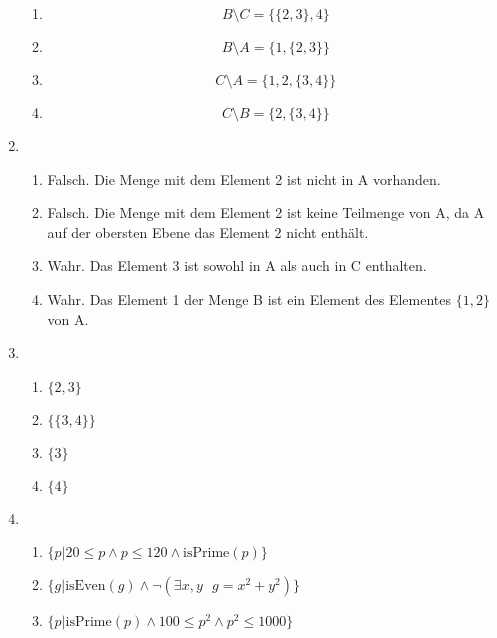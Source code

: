 \documentclass[a4paper]{article}
\begin{document}
\begin{enumerate}
\begin{enumerate}
			\item
			\begin{equation*}
				B \text{\textbackslash} C = \{\{2, 3\}, 4\}
			\end{equation*}
			\item
			\begin{equation*}
				B \text{\textbackslash} A = \{1, \{2, 3\}\}
			\end{equation*}
			
			\item
			\begin{equation*}
				C \text{\textbackslash} A = \{1, 2, \{3, 4\}\}
			\end{equation*}
			\item
			\begin{equation*}
				C \text{\textbackslash} B = \{2, \{3, 4\}\}
			\end{equation*}
		\end{enumerate}
		
		\item
		\begin{enumerate}
			\item Falsch. Die Menge mit dem Element 2 ist nicht in A vorhanden.
			\item Falsch. Die Menge mit dem Element 2 ist keine Teilmenge von A, da A auf der obersten Ebene das Element 2 nicht enthält.
			\item Wahr. Das Element 3 ist sowohl in A als auch in C enthalten.
			\item Wahr. Das Element 1 der Menge B ist ein Element des Elementes $\{1, 2\}$ von A.
		\end{enumerate}
		\clearpage
		
		\item
		\begin{enumerate}
			\item $\{2, 3\}$
			\item $\{\{3, 4\}\}$
			\item $\{3\}$
			\item $\{4\}$
		\end{enumerate}
		
		\item
		\begin{enumerate}
			\item $\{p | 20 \leq p \land p \leq 120 \land \text{isPrime}(p)\}$
			\item $\{g | \text{isEven}(g) \land \lnot (\exists x, y \text{ } g = x^{2} + y^{2})\}$
			\item $\{p | \text{isPrime}(p) \land 100 \leq p^{2} \land p^{2} \leq 1000\}$
		\end{enumerate}
		

\end{enumerate}
\end{document}
